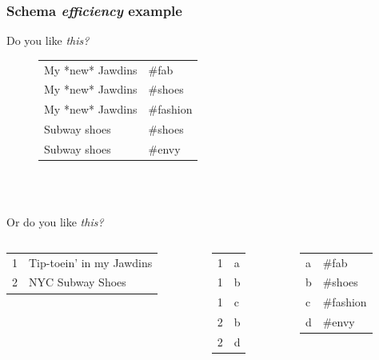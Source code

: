 \documentclass[xcolor={dvipsnames}]{beamer}
\begin{document}
\begin{frame}
\frametitle{Schema \emph{efficiency} example}

\LARGE
Do you like \emph{this?}
\normalsize

\begin{figure}
\centering


\begin{tabular}{|l|l|}
\hline
My *new* Jawdins & \#fab\\
My *new* Jawdins & \#shoes\\
My *new* Jawdins & \#fashion\\
Subway shoes & \#shoes\\
Subway shoes & \#envy \\ \hline
\end{tabular}

\end{figure}

${}$\\${}$

\LARGE
Or do you like \emph{this?}
\normalsize

\begin{columns}
\begin{column}{.5\textwidth}


\begin{tabular}{|l|l|}
\hline
1& Tip-toein' in my Jawdins\\
2 & NYC Subway Shoes \\ \hline
\end{tabular}

\end{column}

\begin{column}{.15\textwidth}

\begin{tabular}{|l|l|}
\hline
1 & a \\
1 & b \\
1 & c \\
2 & b \\
2 & d \\ \hline
\end{tabular}

\end{column}
\begin{column}{.35\textwidth}

\begin{tabular}{|l|l|}
\hline
a & \#fab\\
b & \#shoes\\
c & \#fashion\\
d & \#envy \\ \hline
\end{tabular}

\end{column}
\end{columns}

\end{frame}	
\end{document}
